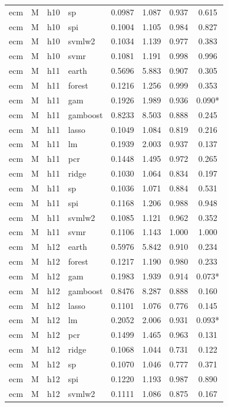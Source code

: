 \begin{ThreePartTable}
\begin{longtable}[t]{llclcccc}
ecm & M & h10 & sp & 0.0987 & 1.087 & 0.937 & 0.615\\
ecm & M & h10 & spi & 0.1004 & 1.105 & 0.984 & 0.827\\
ecm & M & h10 & svmlw2 & 0.1034 & 1.139 & 0.977 & 0.383\\
ecm & M & h10 & svmr & 0.1081 & 1.191 & 0.998 & 0.996\\
\addlinespace
ecm & M & h11 & earth & 0.5696 & 5.883 & 0.907 & 0.305\\
ecm & M & h11 & forest & 0.1216 & 1.256 & 0.999 & 0.353\\
ecm & M & h11 & gam & 0.1926 & 1.989 & 0.936 & 0.090*\\
ecm & M & h11 & gamboost & 0.8233 & 8.503 & 0.888 & 0.245\\
ecm & M & h11 & lasso & 0.1049 & 1.084 & 0.819 & 0.216\\
ecm & M & h11 & lm & 0.1939 & 2.003 & 0.937 & 0.137\\
ecm & M & h11 & pcr & 0.1448 & 1.495 & 0.972 & 0.265\\
ecm & M & h11 & ridge & 0.1030 & 1.064 & 0.834 & 0.197\\
ecm & M & h11 & sp & 0.1036 & 1.071 & 0.884 & 0.531\\
ecm & M & h11 & spi & 0.1168 & 1.206 & 0.988 & 0.948\\
ecm & M & h11 & svmlw2 & 0.1085 & 1.121 & 0.962 & 0.352\\
ecm & M & h11 & svmr & 0.1106 & 1.143 & 1.000 & 1.000\\
\addlinespace
ecm & M & h12 & earth & 0.5976 & 5.842 & 0.910 & 0.234\\
ecm & M & h12 & forest & 0.1217 & 1.190 & 0.980 & 0.233\\
ecm & M & h12 & gam & 0.1983 & 1.939 & 0.914 & 0.073*\\
ecm & M & h12 & gamboost & 0.8476 & 8.287 & 0.888 & 0.160\\
ecm & M & h12 & lasso & 0.1101 & 1.076 & 0.776 & 0.145\\
ecm & M & h12 & lm & 0.2052 & 2.006 & 0.931 & 0.093*\\
ecm & M & h12 & pcr & 0.1499 & 1.465 & 0.963 & 0.131\\
ecm & M & h12 & ridge & 0.1068 & 1.044 & 0.731 & 0.122\\
ecm & M & h12 & sp & 0.1070 & 1.046 & 0.777 & 0.371\\
ecm & M & h12 & spi & 0.1220 & 1.193 & 0.987 & 0.890\\
ecm & M & h12 & svmlw2 & 0.1111 & 1.086 & 0.875 & 0.167\\

\end{longtable}
\end{ThreePartTable}

